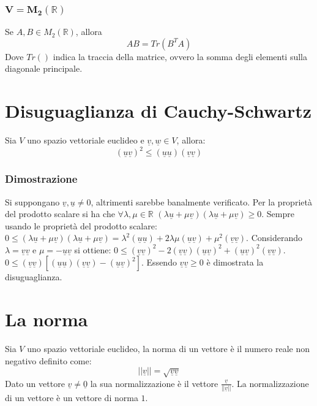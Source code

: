 \subsubsection{$\mathbf{V=M_2(\mathbb{R})}$}
Se $A,B\in M_2(\mathbb{R})$, allora 
\begin{equation}
AB=Tr(B^TA)
\end{equation}
Dove $Tr()$ indica la traccia della matrice, ovvero la somma degli elementi sulla diagonale principale. 
\section{Disuguaglianza di Cauchy-Schwartz}
Sia $V$ uno spazio vettoriale euclideo e $\underline{v},\underline{w}\in V$, allora:
\begin{equation}
(\underline{u}\underline{v})^2\le (\underline{u}\underline{u})(\underline{v}\underline{v})
\end{equation}
\subsubsection{Dimostrazione}
Si suppongano $\underline{v},\underline{u}\neq 0$, altrimenti sarebbe banalmente verificato. Per la propriet\`a del prodotto scalare si ha che $\forall\lambda,\mu\in
\mathbb{R}$ $(\lambda\underline{u}+\mu\underline{v})(\lambda\underline{u}+\mu\underline{v})\ge 0$. Sempre usando le propriet\`a del prodotto scalare: 
$0\le (\lambda\underline{u}+\mu\underline{v})(\lambda\underline{u}+\mu\underline{v})=\lambda^2(\underline{u}\underline{u})+2\lambda\mu(\underline{u}\underline{v})+
\mu^2(\underline{v}\underline{v})$. Considerando $\lambda=\underline{v}\underline{v}$ e $\mu=-\underline{u}\underline{v}$ si ottiene:
$0\le (\underline{v}\underline{v})^2-2(\underline{v}\underline{v})(\underline{u}\underline{v})^2+(\underline{u}\underline{v})^2(\underline{v}\underline{v})$.\\
$0\le(\underline{v}\underline{v})[(\underline{u}\underline{u})(\underline{v}\underline{v})-(\underline{u}\underline{v})^2]$. Essendo $\underline{v}\underline{v}\ge 0$ \`e 
dimostrata la disuguaglianza.
\section{La norma}
Sia $V$ uno spazio vettoriale euclideo, la norma di un vettore \`e il numero reale non negativo definito come:
\begin{equation}
||\underline{v}||=\sqrt{\underline{v}\underline{v}}
\end{equation}
Dato un vettore $\underline{v}\neq \underline{0}$ la sua normalizzazione \`e il vettore $\frac{\underline{v}}{||\underline{v}||}$. La normalizzazione di un vettore 
\`e un vettore di norma $1$.
